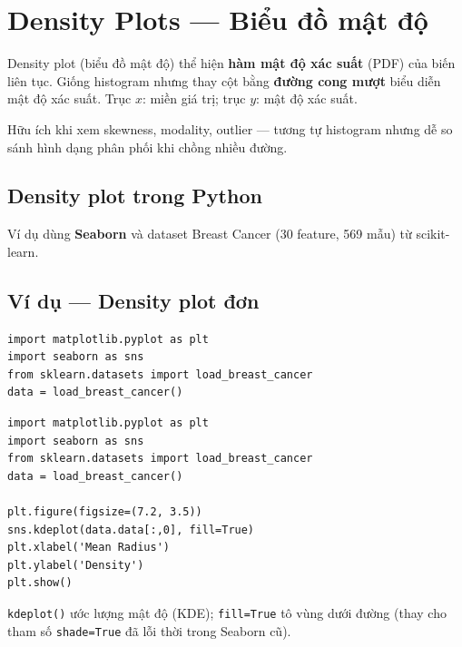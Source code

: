 \section{Density Plots --- Biểu đồ mật độ}
\label{sec:density-plots}

\begin{dinhnghia}[title={Density plot}]
Density plot (biểu đồ mật độ) thể hiện \textbf{hàm mật độ xác suất} (PDF) của biến liên tục.
Giống histogram nhưng thay cột bằng \textbf{đường cong mượt} biểu diễn mật độ xác suất.
Trục $x$: miền giá trị; trục $y$: mật độ xác suất.
\end{dinhnghia}

\begin{ynghia}[title={Ứng dụng}]
Hữu ích khi xem skewness, modality, outlier --- tương tự histogram nhưng dễ so sánh hình dạng phân phối khi chồng nhiều đường.
\end{ynghia}

\subsection{Density plot trong Python}

\begin{phuongphap}[title={Thư viện và dataset}]
Ví dụ dùng \textbf{Seaborn} và dataset Breast Cancer (30 feature, 569 mẫu) từ scikit-learn.
\end{phuongphap}

\subsection{Ví dụ --- Density plot đơn}

\begin{vidu}[title={Import và kdeplot}]
\begin{lstlisting}
import matplotlib.pyplot as plt
import seaborn as sns
from sklearn.datasets import load_breast_cancer
data = load_breast_cancer()
\end{lstlisting}

\begin{lstlisting}
import matplotlib.pyplot as plt
import seaborn as sns
from sklearn.datasets import load_breast_cancer
data = load_breast_cancer()

plt.figure(figsize=(7.2, 3.5))
sns.kdeplot(data.data[:,0], fill=True)
plt.xlabel('Mean Radius')
plt.ylabel('Density')
plt.show()
\end{lstlisting}

\texttt{kdeplot()} ước lượng mật độ (KDE); \texttt{fill=True} tô vùng dưới đường (thay cho tham số \texttt{shade=True} đã lỗi thời trong Seaborn cũ).
\end{vidu}

